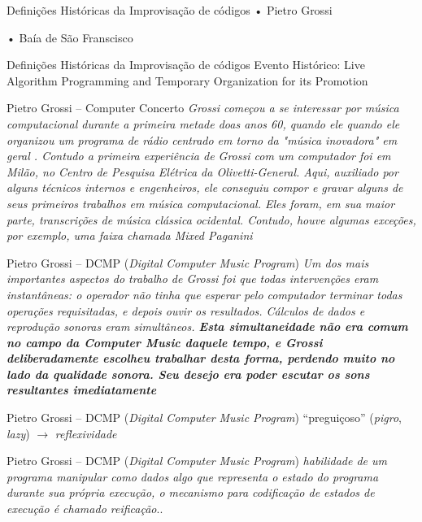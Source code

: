 \documentclass[aspectratio=169]{beamer}
\begin{document}
\begin{frame}{Definições Históricas da Improvisação de códigos}
• Pietro Grossi
  
• Baía de São Franscisco
\end{frame}

\begin{frame}{Definições Históricas da Improvisação de códigos}
Evento Histórico: Live Algorithm Programming and Temporary Organization for its Promotion
\end{frame}

\begin{frame}{Pietro Grossi -- Computer Concerto}
\emph{Grossi começou a se interessar por música computacional durante a primeira metade doas anos 60, quando ele quando ele organizou um programa de rádio centrado em torno da "música inovadora" em geral \cite{giomi_conversasioni_1999}. Contudo a primeira experiência de Grossi com um computador foi em Milão, no Centro de Pesquisa Elétrica da Olivetti-General. Aqui, auxiliado por alguns técnicos internos e engenheiros, ele conseguiu compor e gravar alguns de seus primeiros trabalhos em música computacional. Eles foram, em sua maior parte, transcrições de música clássica ocidental. Contudo, houve algumas exceções, por exemplo, uma faixa chamada Mixed Paganini} \cite[p.~126]{mori_pietro_2015}
\end{frame}

\begin{frame}{Pietro Grossi -- DCMP (\emph{Digital Computer Music Program})}
\emph{Um dos mais importantes aspectos do trabalho de Grossi foi que todas intervenções eram instantâneas: o operador não tinha que esperar pelo computador terminar todas operações requisitadas, e depois ouvir os resultados. Cálculos de dados e reprodução sonoras eram simultâneos. \textbf{Esta simultaneidade não era comum no campo da \emph{Computer Music} daquele tempo, e Grossi deliberadamente escolheu trabalhar desta forma, perdendo muito no lado da qualidade sonora. Seu desejo era poder escutar os sons resultantes imediatamente}} \cite[p.~126]{mori_pietro_2015}
\end{frame}

\begin{frame}{Pietro Grossi -- DCMP (\emph{Digital Computer Music Program})}
``preguiçoso'' (\emph{pigro}, \emph{lazy}) $\rightarrow$ \emph{reflexividade}
\end{frame}

\begin{frame}{Pietro Grossi -- DCMP (\emph{Digital Computer Music Program})}
\emph{habilidade de um programa manipular como dados algo que representa o estado do programa durante sua própria execução, o mecanismo para codificação de estados de execução é chamado \emph{reificação}}.\cite[p.~1]{malefant_reflection_1996}.
\end{frame}
\end{document}
